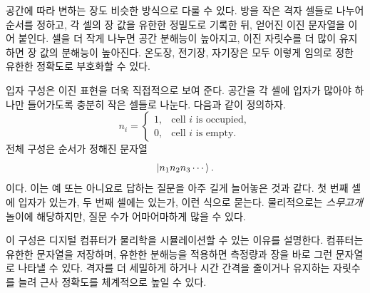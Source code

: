 공간에 따라 변하는 장도 비슷한 방식으로 다룰 수 있다. 방을 작은 격자 셀들로 나누어 순서를 정하고, 각 셀의 장 값을 유한한 정밀도로 기록한 뒤, 얻어진 이진 문자열을 이어 붙인다. 셀을 더 작게 나누면 공간 분해능이 높아지고, 이진 자릿수를 더 많이 유지하면 장 값의 분해능이 높아진다. 온도장, 전기장, 자기장은 모두 이렇게 임의로 정한 유한한 정확도로 부호화할 수 있다.

입자 구성은 이진 표현을 더욱 직접적으로 보여 준다. 공간을 각 셀에 입자가 많아야 하나만 들어가도록 충분히 작은 셀들로 나눈다. 다음과 같이 정의하자.
\begin{equation}
  n_i=
  \begin{cases}
    1,&\text{cell \(i\) is occupied},\\
    0,&\text{cell \(i\) is empty}.
  \end{cases}
  \label{eq:l01-occupancy-bit}
\end{equation}
전체 구성은 순서가 정해진 문자열
\begin{equation}
  \left\lvert n_1n_2n_3\cdots\right\rangle.
\end{equation}
이다. 이는 예 또는 아니요로 답하는 질문을 아주 길게 늘어놓은 것과 같다. 첫 번째 셀에 입자가 있는가, 두 번째 셀에는 있는가, 이런 식으로 묻는다. 물리적으로는 \emph{스무고개} 놀이에 해당하지만, 질문 수가 어마어마하게 많을 수 있다.

이 구성은 디지털 컴퓨터가 물리학을 시뮬레이션할 수 있는 이유를 설명한다. 컴퓨터는 유한한 문자열을 저장하며, 유한한 분해능을 적용하면 측정량과 장을 바로 그런 문자열로 나타낼 수 있다. 격자를 더 세밀하게 하거나 시간 간격을 줄이거나 유지하는 자릿수를 늘려 근사 정확도를 체계적으로 높일 수 있다.

\begin{classroomqa}
\end{classroomqa}

\begin{classroomqa}
\end{classroomqa}

